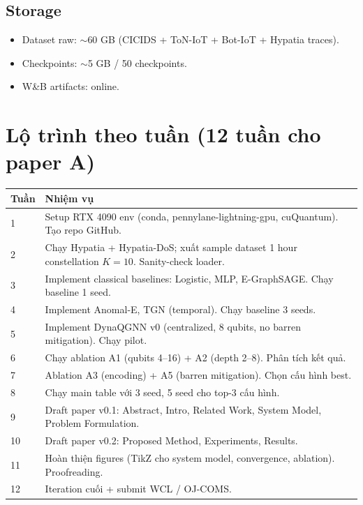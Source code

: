 \documentclass[11pt,a4paper]{article}
\begin{document}
\subsection{Storage}
\begin{itemize}
  \item Dataset raw: $\sim$60 GB (CICIDS + ToN-IoT + Bot-IoT + Hypatia traces).
  \item Checkpoints: $\sim$5 GB / 50 checkpoints.
  \item W\&B artifacts: online.
\end{itemize}

\section{Lộ trình theo tuần (12 tuần cho paper A)}

\begin{longtable}{@{}p{1.3cm} p{14cm}@{}}
\toprule
\textbf{Tuần} & \textbf{Nhiệm vụ} \\
\midrule
\endhead
1 & Setup RTX 4090 env (conda, pennylane-lightning-gpu, cuQuantum). Tạo repo GitHub. \\
2 & Chạy Hypatia + Hypatia-DoS; xuất sample dataset 1 hour constellation $K=10$. Sanity-check loader. \\
3 & Implement classical baselines: Logistic, MLP, E-GraphSAGE. Chạy baseline 1 seed. \\
4 & Implement Anomal-E, TGN (temporal). Chạy baseline 3 seeds. \\
5 & Implement DynaQGNN v0 (centralized, 8 qubits, no barren mitigation). Chạy pilot. \\
6 & Chạy ablation A1 (qubits 4--16) + A2 (depth 2--8). Phân tích kết quả. \\
7 & Ablation A3 (encoding) + A5 (barren mitigation). Chọn cấu hình best. \\
8 & Chạy main table với 3 seed, 5 seed cho top-3 cấu hình. \\
9 & Draft paper v0.1: Abstract, Intro, Related Work, System Model, Problem Formulation. \\
10 & Draft paper v0.2: Proposed Method, Experiments, Results. \\
11 & Hoàn thiện figures (TikZ cho system model, convergence, ablation). Proofreading. \\
12 & Iteration cuối + submit WCL / OJ-COMS. \\
\bottomrule
\end{longtable}
\end{document}

